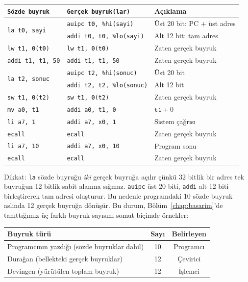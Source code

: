 \begin{ornek}[4.2]
\begin{center}
\small
\begin{tabular}{lll}
\toprule
\texttt{Sözde buyruk} & \texttt{Gerçek buyruk(lar)} & Açıklama \\
\midrule
\multirow{2}{*}{\texttt{la t0, sayi}} & \texttt{auipc t0, \%hi(sayi)} & Üst 20 bit: PC + üst adres \\
                                       & \texttt{addi t0, t0, \%lo(sayi)} & Alt 12 bit: tam adres \\
\texttt{lw t1, 0(t0)} & \texttt{lw t1, 0(t0)} & Zaten gerçek buyruk \\
\texttt{addi t1, t1, 50} & \texttt{addi t1, t1, 50} & Zaten gerçek buyruk \\
\multirow{2}{*}{\texttt{la t2, sonuc}} & \texttt{auipc t2, \%hi(sonuc)} & Üst 20 bit \\
                                        & \texttt{addi t2, t2, \%lo(sonuc)} & Alt 12 bit \\
\texttt{sw t1, 0(t2)} & \texttt{sw t1, 0(t2)} & Zaten gerçek buyruk \\
\texttt{mv a0, t1}  & \texttt{addi a0, t1, 0}  & $\texttt{t1} + 0$ \\
\texttt{li a7, 1}   & \texttt{addi a7, x0, 1}  & Sistem çağrısı \\
\texttt{ecall}       & \texttt{ecall}            & Zaten gerçek buyruk \\
\texttt{li a7, 10}  & \texttt{addi a7, x0, 10} & Program sonu \\
\texttt{ecall}       & \texttt{ecall}            & Zaten gerçek buyruk \\
\bottomrule
\end{tabular}
\end{center}

Dikkat: \texttt{la} sözde buyruğu \emph{iki} gerçek buyruğa açılır çünkü 32 bitlik bir adres tek buyruğun 12 bitlik sabit alanına sığmaz. \texttt{auipc} üst 20 biti, \texttt{addi} alt 12 biti birleştirerek tam adresi oluşturur. Bu nedenle programdaki 10 sözde buyruk aslında 12 gerçek buyruğa dönüşür. Bu durum, Bölüm~\ref{chap:basarim}'de tanıttığımız üç farklı buyruk sayısını somut biçimde örnekler:

\begin{center}
\small
\begin{tabular}{lcc}
\toprule
Buyruk türü & Sayı & Belirleyen \\
\midrule
Programcının yazdığı (sözde buyruklar dahil) & 10 & Programcı \\
Durağan (bellekteki gerçek buyruklar) & 12 & Çevirici \\
Devingen (yürütülen toplam buyruk) & 12 & İşlemci \\
\bottomrule
\end{tabular}
\end{center}


\end{ornek}
